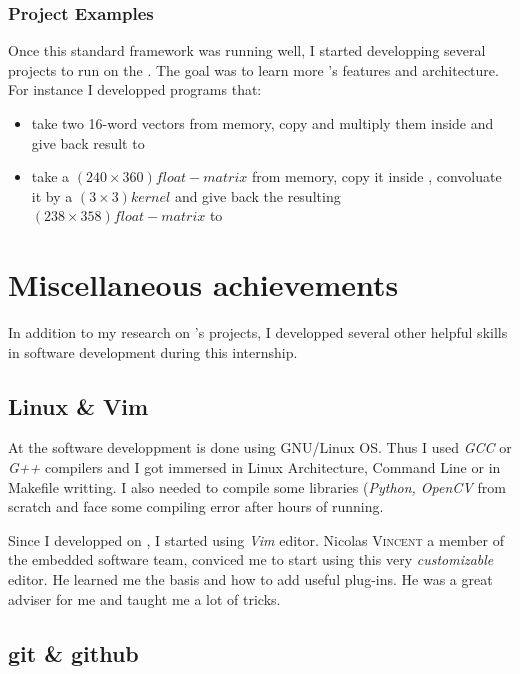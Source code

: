 \subsubsection{Project Examples}

Once this standard framework was running well, I started developping several projects to run on the \rasp. The goal was to learn more \vc{}'s features and architecture. For instance I developped programs that:
\begin{itemize}
	\item take two 16-word vectors from \cpu{} memory, copy and multiply them inside \ram{} and give back result to \cpu
	\item take a $(240\times 360)float-matrix$ from \cpu{} memory, copy it inside \ram{}, convoluate it by a $(3\times 3)kernel$ and give back the resulting $(238\times 358)float-matrix$ to \cpu
\end{itemize}
\newpage


\section{Miscellaneous achievements}

In addition to my research on \vc{}'s projects, I developped several other helpful skills in software development during this internship.


\subsection{Linux \& Vim}

At \groupname{} the software developpment is done using GNU/Linux OS. Thus I used \emph{GCC} or \emph{G++} compilers and I got immersed in Linux Architecture, Command Line or in Makefile writting. I also needed to compile some libraries (\emph{Python, OpenCV} from scratch and face some compiling error after hours of running.

Since I developped on \rasp{}, I started using \emph{Vim} editor. Nicolas \textsc{Vincent} a member of the embedded software team, conviced me to start using this very \emph{customizable} editor. He learned me the basis and how to add useful plug-ins. He was a great adviser for me and taught me a lot of tricks.


\subsection{git \& github}

